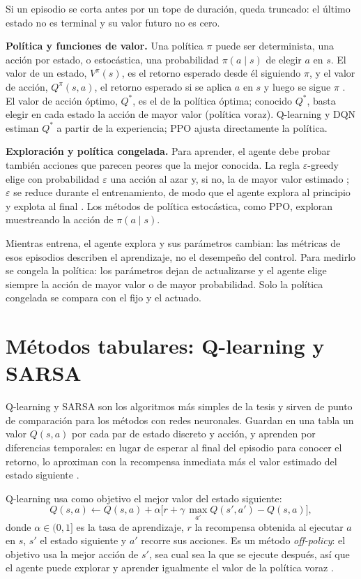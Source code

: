Si un episodio se corta antes por un tope de duración, queda truncado: el último estado no es
terminal y su valor futuro no es cero.

\noindent\textbf{Política y funciones de valor.} Una política $\pi$ puede ser determinista, una
acción por estado, o estocástica, una probabilidad $\pi(a \mid s)$ de elegir $a$ en $s$. El valor
de un estado, $V^{\pi}(s)$, es el retorno esperado desde él siguiendo $\pi$, y el valor de acción,
$Q^{\pi}(s,a)$, el retorno esperado si se aplica $a$ en $s$ y luego se sigue $\pi$
\citep{SuttonBarto2018}. El valor de acción óptimo, $Q^*$, es el de la política óptima; conocido
$Q^*$, basta elegir en cada estado la acción de mayor valor (política voraz). Q-learning y DQN
estiman $Q^*$ a partir de la experiencia; PPO ajusta directamente la política.

\noindent\textbf{Exploración y política congelada.} Para aprender, el agente debe probar también
acciones que parecen peores que la mejor conocida. La regla $\varepsilon$-greedy elige con
probabilidad $\varepsilon$ una acción al azar y, si no, la de mayor valor estimado
\citep{SuttonBarto2018}; $\varepsilon$ se reduce durante el entrenamiento, de modo que el agente
explora al principio y explota al final \citep{Mnih2015_DQN}. Los métodos de política estocástica,
como PPO, exploran muestreando la acción de $\pi(a \mid s)$.

Mientras entrena, el agente explora y sus parámetros cambian: las métricas de esos episodios
describen el aprendizaje, no el desempeño del control. Para medirlo se congela la política: los
parámetros dejan de actualizarse y el agente elige siempre la acción de mayor valor o de mayor
probabilidad. Solo la política congelada se compara con el fijo y el actuado.

\section{Métodos tabulares: Q-learning y SARSA}
\label{sec:tabular}

Q-learning y SARSA son los algoritmos más simples de la tesis y sirven de punto de comparación
para los métodos con redes neuronales. Guardan en una tabla un valor $Q(s,a)$ por cada par de
estado discreto y acción, y aprenden por diferencias temporales: en lugar de esperar al final del
episodio para conocer el retorno, lo aproximan con la recompensa inmediata más el valor estimado
del estado siguiente \citep{SuttonBarto2018}.

Q-learning usa como objetivo el mejor valor del estado siguiente:
\begin{equation}
  Q(s,a) \leftarrow Q(s,a) + \alpha \bigl[r + \gamma\, \max_{a'} Q(s',a') - Q(s,a)\bigr],
  \label{eq:q-learning}
\end{equation}
donde $\alpha \in (0,1]$ es la tasa de aprendizaje, $r$ la recompensa obtenida al ejecutar $a$ en
$s$, $s'$ el estado siguiente y $a'$ recorre sus acciones. Es un método \textit{off-policy}: el
objetivo usa la mejor acción de $s'$, sea cual sea la que se ejecute después, así que el agente
puede explorar y aprender igualmente el valor de la política voraz \citep{SuttonBarto2018}.

